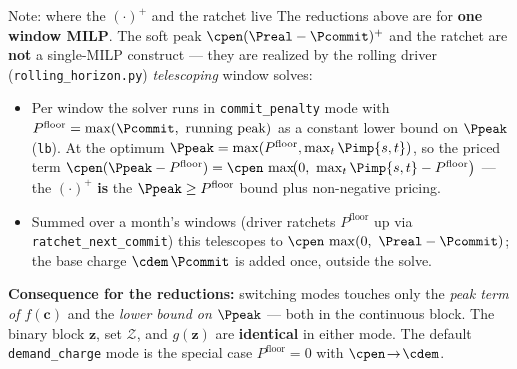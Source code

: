\begin{frame}{Note: where the $(\cdot)^{+}$ and the ratchet live}
\footnotesize
The reductions above are for \textbf{one window MILP}. The soft peak
$\cpen(\Preal-\Pcommit)^{+}$ and the ratchet are \textbf{not} a single-MILP
construct — they are realized by the rolling driver (\texttt{rolling\_horizon.py})
\emph{telescoping} window solves:
\begin{itemize}
  \item Per window the solver runs in \texttt{commit\_penalty} mode with
        $P^{\text{floor}}=\max(\Pcommit,\ \text{running peak})$ as a constant lower bound on $\Ppeak$ (\texttt{lb}). At the optimum $\Ppeak=\max(P^{\text{floor}},\max_t\Pimp{s,t})$, so the priced term
        $\cpen(\Ppeak-P^{\text{floor}})=\cpen\,\max\!\bigl(0,\ \max_t\Pimp{s,t}-P^{\text{floor}}\bigr)$
        — the $(\cdot)^{+}$ \textbf{is} the $\Ppeak\ge P^{\text{floor}}$ bound plus non-negative pricing.
  \item Summed over a month's windows (driver ratchets $P^{\text{floor}}$ up via
        \texttt{ratchet\_next\_commit}) this telescopes to
        $\cpen\,\max(0,\ \Preal-\Pcommit)$; the base charge $\cdem\,\Pcommit$ is added once, outside the solve.
\end{itemize}
\textbf{Consequence for the reductions:} switching modes touches only the
\emph{peak term of $f(\mathbf c)$} and the \emph{lower bound on $\Ppeak$} — both in the
continuous block. The binary block $\mathbf z$, set $\mathcal Z$, and $g(\mathbf z)$ are
\textbf{identical} in either mode. The default \texttt{demand\_charge} mode is the special case
$P^{\text{floor}}=0$ with $\cpen\!\to\!\cdem$.
\end{frame}
